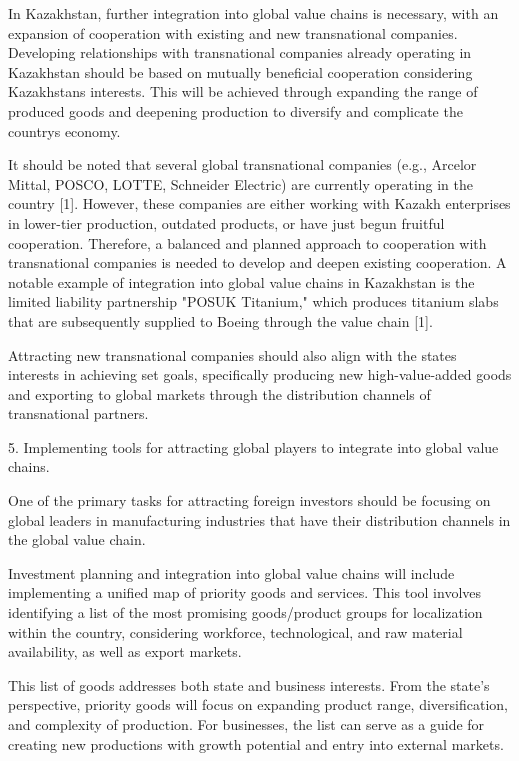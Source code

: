 \begin{multicols}{2}
In Kazakhstan, further integration into global value chains is
necessary, with an expansion of cooperation with existing and new
transnational companies. Developing relationships with transnational
companies already operating in Kazakhstan should be based on mutually
beneficial cooperation considering Kazakhstan\textquotesingle s
interests. This will be achieved through expanding the range of produced
goods and deepening production to diversify and complicate the
country\textquotesingle s economy.

It should be noted that several global transnational companies (e.g.,
Arcelor Mittal, POSCO, LOTTE, Schneider Electric) are currently
operating in the country {[}1{]}. However, these companies are either
working with Kazakh enterprises in lower-tier production, outdated
products, or have just begun fruitful cooperation. Therefore, a balanced
and planned approach to cooperation with transnational companies is
needed to develop and deepen existing cooperation. A notable example of
integration into global value chains in Kazakhstan is the limited
liability partnership "POSUK Titanium," which produces titanium slabs
that are subsequently supplied to Boeing through the value chain
{[}1{]}.

Attracting new transnational companies should also align with the
state\textquotesingle s interests in achieving set goals, specifically
producing new high-value-added goods and exporting to global markets
through the distribution channels of transnational partners.

5. Implementing tools for attracting global players to integrate into
global value chains.

One of the primary tasks for attracting foreign investors should be
focusing on global leaders in manufacturing industries that have their
distribution channels in the global value chain.

Investment planning and integration into global value chains will
include implementing a unified map of priority goods and services. This
tool involves identifying a list of the most promising goods/product
groups for localization within the country, considering workforce,
technological, and raw material availability, as well as export markets.

This list of goods addresses both state and business interests. From the
state's perspective, priority goods will focus on expanding product
range, diversification, and complexity of production. For businesses,
the list can serve as a guide for creating new productions with growth
potential and entry into external markets.
\end{multicols}

